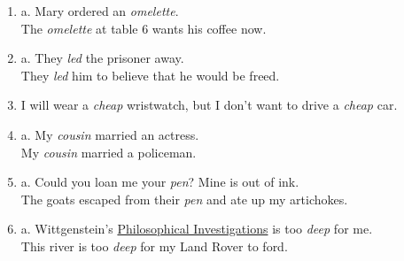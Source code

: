 \begin{enumerate}
\item a. Mary ordered an \textit{omelette}.\\
\ex The \textit{omelette} at table 6 wants his coffee now.
\item a. They \textit{led} the prisoner away.\\
\ex They \textit{led} him to believe that he would be freed.
\item I will wear a \textit{cheap} wristwatch, but I don’t want to drive a \textit{cheap} car.
\item a. My \textit{cousin} married an actress.\\
\ex My \textit{cousin} married a policeman.
\item a. Could you loan me your \textit{pen}? Mine is out of ink.\\
\ex The goats escaped from their \textit{pen} and ate up my artichokes.
\item a. Wittgenstein’s \href{http://en.wikipedia.org/wiki/Philosophical_Investigations}{Philosophical Investigations} is too \textit{deep} for me.\\
\ex This river is too \textit{deep} for my Land Rover to ford.
\end{enumerate}

